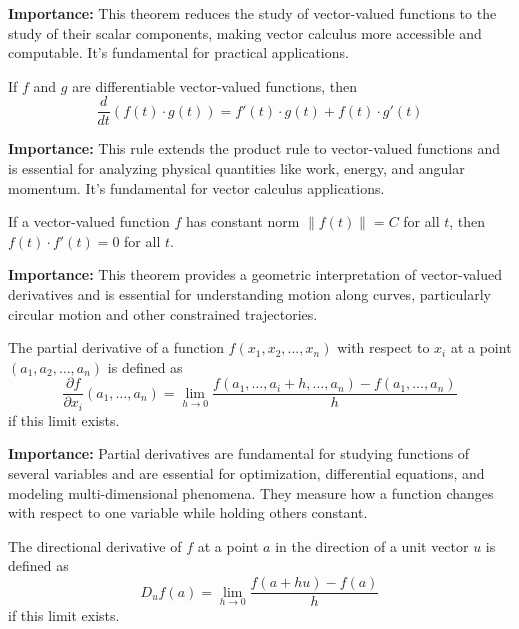 \noindent\textbf{Importance:} This theorem reduces the study of vector-valued functions to the study of their scalar components, making vector calculus more accessible and computable. It's fundamental for practical applications.



\begin{theorem}
If $f$ and $g$ are differentiable vector-valued functions, then
\[ \frac{d}{dt}(f(t) \cdot g(t)) = f'(t) \cdot g(t) + f(t) \cdot g'(t) \]
\end{theorem}

\noindent\textbf{Importance:} This rule extends the product rule to vector-valued functions and is essential for analyzing physical quantities like work, energy, and angular momentum. It's fundamental for vector calculus applications.



\begin{theorem}
If a vector-valued function $f$ has constant norm $\|f(t)\| = C$ for all $t$, then $f(t) \cdot f'(t) = 0$ for all $t$.
\end{theorem}

\noindent\textbf{Importance:} This theorem provides a geometric interpretation of vector-valued derivatives and is essential for understanding motion along curves, particularly circular motion and other constrained trajectories.



\begin{definition}
The partial derivative of a function $f(x_1, x_2, \ldots, x_n)$ with respect to $x_i$ at a point $(a_1, a_2, \ldots, a_n)$ is defined as
\[ \frac{\partial f}{\partial x_i}(a_1, \ldots, a_n) = \lim_{h \to 0} \frac{f(a_1, \ldots, a_i + h, \ldots, a_n) - f(a_1, \ldots, a_n)}{h} \]
if this limit exists.
\end{definition}

\noindent\textbf{Importance:} Partial derivatives are fundamental for studying functions of several variables and are essential for optimization, differential equations, and modeling multi-dimensional phenomena. They measure how a function changes with respect to one variable while holding others constant.



\begin{definition}
The directional derivative of $f$ at a point $a$ in the direction of a unit vector $u$ is defined as
\[ D_u f(a) = \lim_{h \to 0} \frac{f(a + hu) - f(a)}{h} \]
if this limit exists.
\end{definition}

